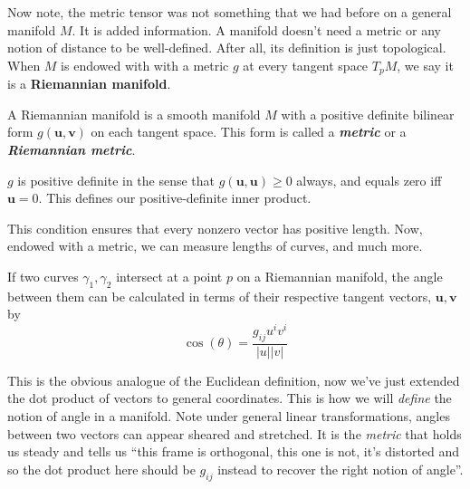 \documentclass[../master.tex]{subfiles}
\begin{document}
	
	Now note, the metric tensor was not something that we had before on a general manifold $M$. It is added information. A manifold doesn't need a metric or any notion of distance to be well-defined. After all, its definition is just topological. When $M$ is endowed with with a metric $g$ at every tangent space $T_p M$, we say it is a \textbf{Riemannian manifold}. 
	\begin{defn}
		A Riemannian manifold is a smooth manifold $M$ with a positive definite bilinear form $g(\mathbf u, \mathbf v)$ on each tangent space. This form is called a \emph{\textbf{metric}} or a \emph{\textbf{Riemannian metric}}.
		
		$g$ is positive definite in the sense that $g(\mathbf u, \mathbf u) \geq 0$ always, and equals zero iff $\mathbf u = 0$. This defines our positive-definite inner product. 
	\end{defn}
	This condition ensures that every nonzero vector has positive length. Now, endowed with a metric, we can measure lengths of curves, and much more. 
	\begin{prop}
		If two curves $\gamma_1, \gamma_2$ intersect at a point $p$ on a Riemannian manifold, the angle between them can be calculated in terms of their respective tangent vectors, $\mathbf u, \mathbf v$ by
		\begin{equation}
			\cos(\theta)=\frac{g_{ij} u^i v^i}{|u| |v|}
		\end{equation}
	\end{prop}
	This is the obvious analogue of the Euclidean definition, now we've just extended the dot product of vectors to general coordinates. This is how we will \emph{define} the notion of angle in a manifold. Note under general linear transformations, angles between two vectors can appear sheared and stretched. It is the \emph{metric} that holds us steady and tells us ``this frame is orthogonal, this one is not, it's distorted and so the dot product here should be $g_{ij}$ instead to recover the right notion of angle''.
	
\end{document}
